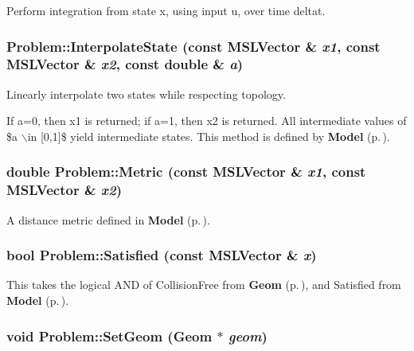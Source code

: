 Perform integration from state x, using input u, over time deltat.

\subsubsection{ Problem::Interpolate\-State (const {\bf MSLVector} \& {\em x1}, const {\bf MSLVector} \& {\em x2}, const double \& {\em a})\hspace{0.3cm}{\tt  [virtual]}}\label{class_Problem_a7}


Linearly interpolate two states while respecting topology.

If a=0, then x1 is returned; if a=1, then x2 is returned. All intermediate values of \$a $\backslash$in [0,1]\$ yield intermediate states. This method is defined by {\bf Model} {\rm (p.\,\pageref{class_Model})}. 
\subsubsection{\setlength{\rightskip}{0pt plus 5cm}double Problem::Metric (const {\bf MSLVector} \& {\em x1}, const {\bf MSLVector} \& {\em x2})\hspace{0.3cm}{\tt  [virtual]}}\label{class_Problem_a8}


A distance metric defined in {\bf Model} {\rm (p.\,\pageref{class_Model})}.

\subsubsection{\setlength{\rightskip}{0pt plus 5cm}bool Problem::Satisfied (const {\bf MSLVector} \& {\em x})\hspace{0.3cm}{\tt  [virtual]}}\label{class_Problem_a11}


This takes the logical AND of Collision\-Free from {\bf Geom} {\rm (p.\,\pageref{class_Geom})}, and Satisfied from {\bf Model} {\rm (p.\,\pageref{class_Model})}.

\subsubsection{\setlength{\rightskip}{0pt plus 5cm}void Problem::Set\-Geom ({\bf Geom} $\ast$ {\em geom})}\label{class_Problem_a2}


